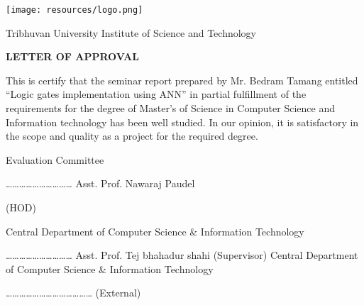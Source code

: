 \begin{center}
	\texttt{[image: resources/logo.png]}
\end{center}

\begin{center}
	Tribhuvan University
	\linebreak
	Institute of Science and Technology 
\end{center}


\begin{center}
	\vspace{2cm}
	\textbf{
		LETTER OF APPROVAL
	}
\end{center}



\vspace{2cm}
This is certify that the seminar report prepared by Mr. Bedram Tamang entitled “Logic gates implementation using ANN” in partial fulfillment of the requirements for the degree of Master's of Science in Computer Science and Information technology has been well studied. In our opinion, it is satisfactory in the scope and quality as a project for the required degree. 


\begin{center}
	Evaluation Committee
\end{center}

\begin{multicols}{2}
	\begin{flushleft}
		…………………………  \newline        
		Asst. Prof. Nawaraj Paudel
	\end{flushleft}
	(HOD)
	\begin{flushleft}	
		Central Department of Computer\newline
		Science \& Information Technology
	\end{flushleft}	
	\columnbreak
	\begin{flushleft}
		………………………… \newline
		Asst. Prof. Tej bhahadur shahi	
		(Supervisor) \newline	
		Central Department of Computer \newline           
		Science \& Information Technology        
	\end{flushleft}
\end{multicols}


\vspace{1cm}
\begin{flushleft}
	…………………………………\newline
	(External)
\end{flushleft}
\clearpage
